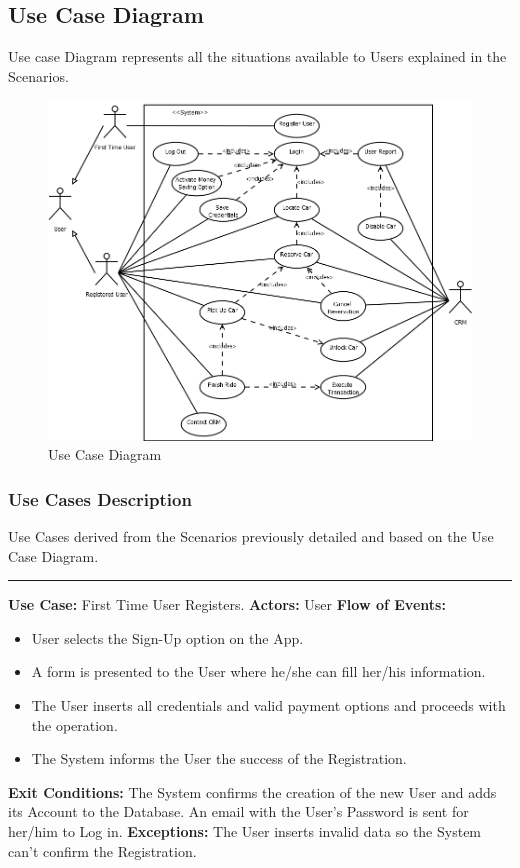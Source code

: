 \documentclass[a4paper]{article}
\begin{document}
\subsection{Use Case Diagram}
Use case Diagram represents all the situations available to Users explained in the Scenarios.
\begin{figure}[h]
\centering
\includegraphics[width=1.1\textwidth]{UseCaseCRM.png}
\caption {Use Case Diagram}
\end{figure}
\newpage

\subsubsection{Use Cases Description}
Use Cases derived from the Scenarios previously detailed and based on the Use Case Diagram.
\begin{center}
\rule{8cm}{0.4pt}
\end{center}
\textbf{Use Case:} First Time User Registers.
\newline
\textbf{Actors:} User
\newline
\textbf{Flow of Events:}
\begin{itemize}
\item User selects the Sign-Up option on the App.
\item A form is presented to the User where he/she can fill her/his information.
\item The User inserts all credentials and valid payment options and proceeds with the operation.
\item The System informs the User the success of the Registration.
\end{itemize}
\textbf{Exit Conditions:} The System confirms the creation of the new User and adds its Account to the Database. An email with the User's Password is sent for her/him to Log in.
\newline
\textbf{Exceptions:} The User inserts invalid data so the System can't confirm the Registration.
\newline
\end{document}
